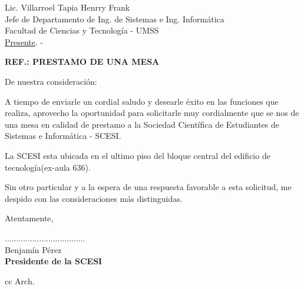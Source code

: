 \documentclass[letterpaper,12pt]{letter}
\begin{document}
\date{1 de diciembre de 2011}
\begin{letter}{Lic. Villarroel Tapia Henrry Frank \\ Jefe de Departamento de Ing. de Sistemas e Ing. Inform\'atica\\ Facultad de Ciencias y Tecnolog\'ia - UMSS \\ \underline {Presente}. -}

\begin{center}
	\opening{\textbf{REF.: PRESTAMO DE UNA MESA}}
\end{center}

De nuestra consideración:

A tiempo de enviarle un cordial saludo y desearle éxito en las funciones que realiza, 
aprovecho la oportunidad para solicitarle muy cordialmente que se nos de una mesa en 
calidad de prestamo a la Sociedad Cient\'ifica de Estudiantes de 
Sistemas e Inform\'atica - SCESI.

La SCESI esta ubicada en el ultimo piso del bloque central del edificio de tecnolog\'ia(ex-aula 636).

Sin otro particular y a la espera de una respuesta favorable a esta solicitud, me despido con las consideraciones más distinguidas.

Atentamente,

\vspace{3cm}

\begin{center}
...................................\\
Benjam\'in P\'erez\\
{\bfseries Presidente de la  SCESI}
\end{center}
\vspace{1cm}
cc Arch.
\end{letter}
\end{document}
